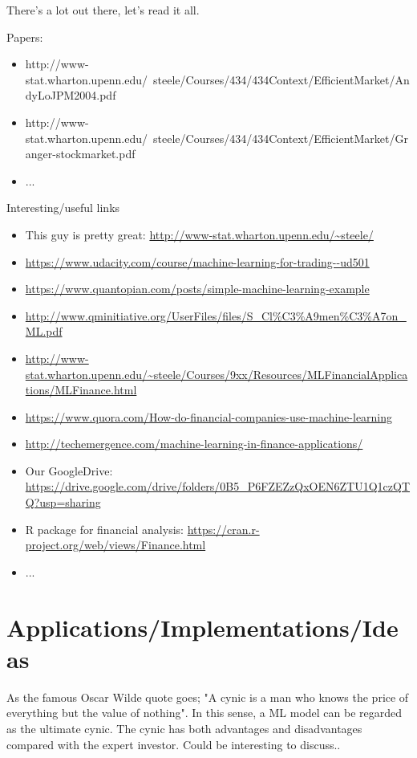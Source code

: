 \documentclass[12pt, oneside]{article}
\begin{document}
There's a lot out there, let's read it all.

Papers: 
\begin{itemize}
\item http://www-stat.wharton.upenn.edu/~steele/Courses/434/434Context/EfficientMarket/AndyLoJPM2004.pdf

\item http://www-stat.wharton.upenn.edu/~steele/Courses/434/434Context/EfficientMarket/Granger-stockmarket.pdf

\item ...
\end{itemize}

Interesting/useful links
\begin{itemize}
\item This guy is pretty great: \url{http://www-stat.wharton.upenn.edu/~steele/}
\item \url{https://www.udacity.com/course/machine-learning-for-trading--ud501}
\item \url{https://www.quantopian.com/posts/simple-machine-learning-example}
\item \url{http://www.qminitiative.org/UserFiles/files/S_Cl\%C3\%A9men\%C3\%A7on_ML.pdf}
\item \url{http://www-stat.wharton.upenn.edu/~steele/Courses/9xx/Resources/MLFinancialApplications/MLFinance.html}
\item \url{https://www.quora.com/How-do-financial-companies-use-machine-learning}
\item \url{http://techemergence.com/machine-learning-in-finance-applications/}
\item Our GoogleDrive: \url{https://drive.google.com/drive/folders/0B5_P6FZEZzQxOEN6ZTU1Q1czQTQ?usp=sharing}
\item R package for financial analysis: \url{https://cran.r-project.org/web/views/Finance.html}

\item ...

\end{itemize}

\section{Applications/Implementations/Ideas}

As the famous Oscar Wilde quote goes; "A cynic is a man who knows the price of everything but the value of nothing". In this sense, a ML model can be regarded as the ultimate cynic. The cynic has both advantages and disadvantages compared with the expert investor. Could be interesting to discuss..
\end{document}
